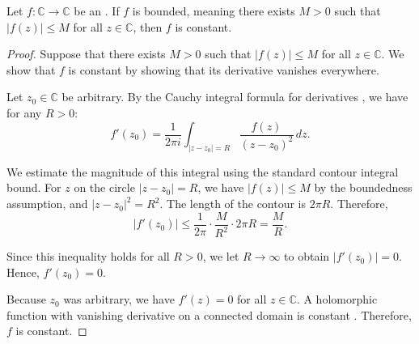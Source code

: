 \begin{theorem} \label{theorem:liouvilles_theorem_on_bounded_entire_holomorphic_functions}
Let $f : \mathbb{C} \to \mathbb{C}$ be an .
If $f$ is bounded, meaning there exists $M > 0$ such that
$|f(z)| \leq M$
for all $z \in \mathbb{C}$, then $f$ is constant.
\end{theorem}

\begin{proof}
Suppose that there exists $M > 0$ such that $|f(z)| \leq M$ for all $z \in \mathbb{C}$. We show that $f$ is constant by showing that its derivative vanishes everywhere.

Let $z_0 \in \mathbb{C}$ be arbitrary. By the Cauchy integral formula for derivatives , we have for any $R > 0$:
$$f'(z_0) = \frac{1}{2\pi i} \int_{|z-z_0|=R} \frac{f(z)}{(z-z_0)^2}\,dz.$$

We estimate the magnitude of this integral using the standard contour integral bound. For $z$ on the circle $|z-z_0| = R$, we have $|f(z)| \leq M$ by the boundedness assumption, and $|z-z_0|^2 = R^2$. The length of the contour is $2\pi R$. Therefore,
$$|f'(z_0)| \leq \frac{1}{2\pi} \cdot \frac{M}{R^2} \cdot 2\pi R = \frac{M}{R}.$$

Since this inequality holds for all $R > 0$, we let $R \to \infty$ to obtain $|f'(z_0)| = 0$. Hence, $f'(z_0) = 0$.

Because $z_0$ was arbitrary, we have $f'(z) = 0$ for all $z \in \mathbb{C}$. A holomorphic function with vanishing derivative on a connected domain is constant . Therefore, $f$ is constant.
\end{proof}
